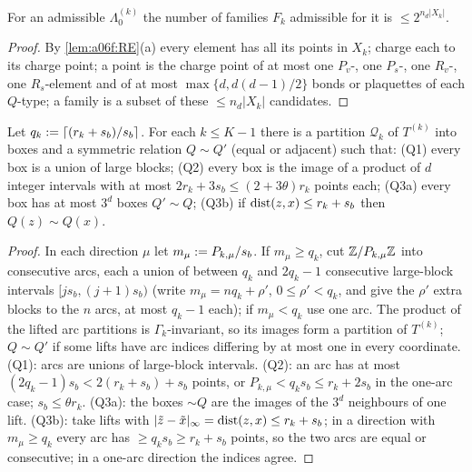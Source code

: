 \begin{lemma}\label{lem:a06f:RN}
For an admissible $\Lambda^{(k)}_0$ the number of families $F_k$ admissible for it is $\le2^{n_d|X_k|}$.
\end{lemma}

\begin{proof}
By \cref{lem:a06f:RE}(a) every element has all its points in $X_k$; charge each to its charge point; a point is the charge point of at most one $P_v$-, one $P_s$-, one $R_v$-, one $R_s$-element and of at most $\max\{d,d(d-1)/2\}$ bonds or plaquettes of each $Q$-type; a family is a subset of these $\le n_d|X_k|$ candidates.
\end{proof}

\begin{lemma}\label{lem:a06f:RP}
Let $q_k:=\lceil(r_k+s_b)/s_b\rceil$. For each $k\le K-1$ there is a partition $\mathcal Q_k$ of $T^{(k)}$ into boxes and a symmetric relation $Q\sim Q'$ (equal or adjacent) such that: (Q1) every box is a union of large blocks; (Q2) every box is the image of a product of $d$ integer intervals with at most $2r_k+3s_b\le(2+3\theta)r_k$ points each; (Q3a) every box has at most $3^d$ boxes $Q'\sim Q$; (Q3b) if $\operatorname{dist}(z,x)\le r_k+s_b$ then $Q(z)\sim Q(x)$.
\end{lemma}

\begin{proof}
In each direction $\mu$ let $m_\mu:= P_{k,\mu}/s_b$. If $m_\mu\ge q_k$, cut $\mathbb Z/P_{k,\mu}\mathbb Z$ into consecutive arcs, each a union of between $q_k$ and $2q_k-1$ consecutive large-block intervals $[js_b,(j+1)s_b)$ (write $m_\mu=nq_k+\rho'$, $0\le\rho'<q_k$, and give the $\rho'$ extra blocks to the $n$ arcs, at most $q_k-1$ each); if $m_\mu<q_k$ use one arc. The product of the lifted arc partitions is $\Gamma_k$-invariant, so its images form a partition of $T^{(k)}$; $Q\sim Q'$ if some lifts have arc indices differing by at most one in every coordinate. (Q1): arcs are unions of large-block intervals. (Q2): an arc has at most $(2q_k-1)s_b<2(r_k+s_b)+s_b$ points, or $P_{k,\mu}<q_ks_b\le r_k+2s_b$ in the one-arc case; $s_b\le\theta r_k$. (Q3a): the boxes $\sim Q$ are the images of the $3^d$ neighbours of one lift. (Q3b): take lifts with $|\tilde z-\tilde x|_\infty=\operatorname{dist}(z,x)\le r_k+s_b$; in a direction with $m_\mu\ge q_k$ every arc has $\ge q_ks_b\ge r_k+s_b$ points, so the two arcs are equal or consecutive; in a one-arc direction the indices agree.
\end{proof}

